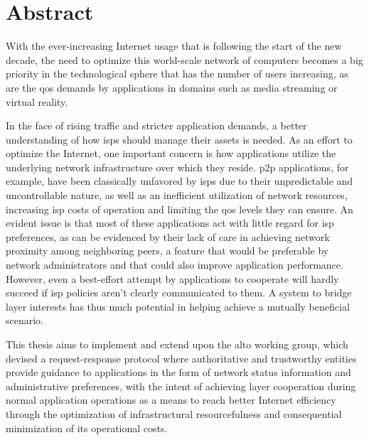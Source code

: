 \chapter{Abstract}

    With the ever-increasing Internet usage that is following the start of the new decade, the need to optimize this world-scale network of computers becomes a big priority in the technological sphere that has the number of users increasing, as are the \gls{qos} demands by applications in domains such as media streaming or virtual reality.

    In the face of rising traffic and stricter application demands, a better understanding of how \glspl{isp} should manage their assets is needed.
    As an effort to optimize the Internet, one important concern is how applications utilize the underlying network infrastructure over which they reside.
    \gls{p2p} applications, for example, have been classically unfavored by \glspl{isp} due to their unpredictable and uncontrollable nature, as well as an inefficient utilization of network resources, increasing \gls{isp} costs of operation and limiting the \gls{qos} levels they can ensure.
    An evident issue is that most of these applications act with little regard for \gls{isp} preferences, as can be evidenced by their lack of care in achieving network proximity among neighboring peers, a feature that would be preferable by network administrators and that could also improve application performance.
    However, even a best-effort attempt by applications to cooperate will hardly succeed if \gls{isp} policies aren't clearly communicated to them.
    A system to bridge layer interests has thus much potential in helping achieve a mutually beneficial scenario.

    This thesis aims to implement and extend upon the \gls{alto} working group, which devised a request-response protocol where authoritative and trustworthy entities provide guidance to applications in the form of network status information and administrative preferences, with the intent of achieving layer cooperation during normal application operations as a means to reach better Internet efficiency through the optimization of infrastructural resourcefulness and consequential minimization of its operational costs.

